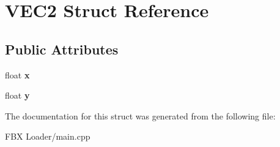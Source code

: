 \hypertarget{struct_v_e_c2}{}\section{V\+E\+C2 Struct Reference}
\label{struct_v_e_c2}
\subsection*{Public Attributes}
\begin{DoxyCompactItemize}
\item 
float {\bfseries x}\hypertarget{struct_v_e_c2_a8bb31e9a1c8adba4f2656ad62a57398b}{}\label{struct_v_e_c2_a8bb31e9a1c8adba4f2656ad62a57398b}

\item 
float {\bfseries y}\hypertarget{struct_v_e_c2_a8d059cae30cd00029f7e6ce2bea282a0}{}\label{struct_v_e_c2_a8d059cae30cd00029f7e6ce2bea282a0}

\end{DoxyCompactItemize}


The documentation for this struct was generated from the following file\+:\begin{DoxyCompactItemize}
\item 
F\+B\+X Loader/main.\+cpp\end{DoxyCompactItemize}
